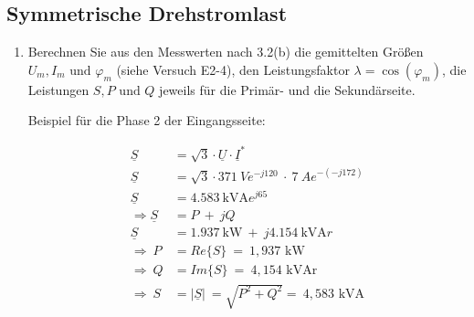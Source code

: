 \subsection{Symmetrische Drehstromlast}
\begin{enumerate}[label=\alph*)]

	\item Berechnen Sie aus den Messwerten nach 3.2(b) die gemittelten Größen $U_m, I_m
		      \text{ und } \varphi_m$ (siehe Versuch E2-4), den Leistungsfaktor $\lambda =
		      \cos(\varphi_m)$, die Leistungen $S, P \text{ und } Q$ jeweils für die Primär-
	      und die Sekundärseite.

	      Beispiel für die Phase 2 der Eingangsseite:
	      \begin{center}
		      \begin{align*}
			      \underline{S}                 & = \sqrt{3}\cdot\underline{U}\cdot\underline{I}^*                                    \\
			      \underline{S}                 & = \sqrt{3}\cdot 371\ Ve^{-j120}\ \cdot\ 7\ Ae^{-(-j172)}                            \\
			      \underline{S}                 & = \SI{4,583}{\kilo\volt\ampere}e^{j65}                                              \\
			      \Longrightarrow \underline{S} & =  P\ +\ jQ                                                                         \\
			      \underline{S}                 & = \SI{1,937}{\kilo\watt}\ +\ j\SI{4,154}{\kilo\volt\ampere r}                       \\
			      \Longrightarrow\ P            & = Re{\{S\}}\                                                   =\ 1,937\text{ kW}   \\
			      \Longrightarrow\ Q            & = Im{\{S\}}\                                                   =\ 4,154\text{ kVAr} \\
			      \Longrightarrow\ S            & =  \left\lvert {\underline{S}}  \right\rvert\ = \sqrt{P^2+Q^2} =\ 4,583\text{ kVA}  \\               \\
		      \end{align*}
	      \end{center}


\end{enumerate}
